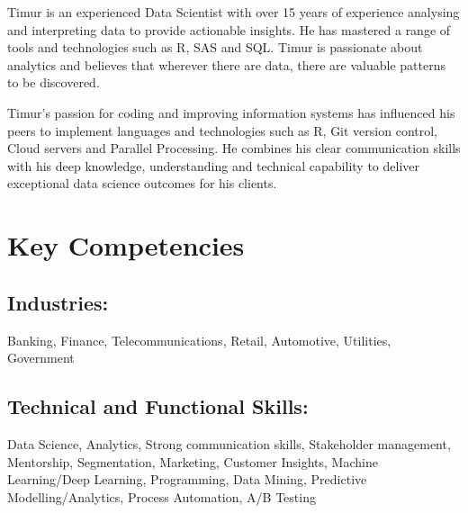 \documentclass{article}
\begin{document}

\pagestyle{fancy}
\fancyhf{} %



Timur is an experienced Data Scientist with over 15 years of experience analysing and interpreting data to provide actionable insights. He has mastered a range of tools and technologies such as R, SAS and SQL. Timur is passionate about analytics and believes that wherever there are data, there are valuable patterns to be discovered.

Timur's passion for coding and improving information systems has influenced his peers to implement languages and technologies such as R, Git version control, Cloud servers and 
Parallel Processing. He combines his clear communication skills with his deep knowledge, understanding and technical capability to deliver exceptional data science outcomes for his clients.

\section{Key Competencies}
\subsection{Industries:}
Banking, Finance, Telecommunications, Retail, Automotive, Utilities, Government

\subsection{Technical and Functional Skills:}
Data Science, Analytics, Strong communication skills, Stakeholder management, Mentorship, Segmentation, Marketing, Customer Insights, Machine Learning/Deep Learning, Programming, Data Mining, Predictive Modelling/Analytics, Process Automation, A/B Testing
\end{document}
